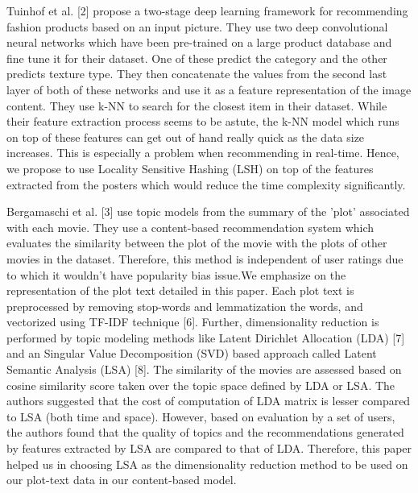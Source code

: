 \documentclass{article}
\begin{document}
Tuinhof et al. [2] propose a two-stage deep learning framework for recommending fashion products based on an input picture. They use two deep convolutional neural networks which have been pre-trained on a large product database and fine tune it for their dataset. One of these predict the category and the other predicts texture type. They then concatenate the values from the second last layer of both of these networks and use it as a feature representation of the image content. They use k-NN to search for the closest item in their dataset.
While their feature extraction process seems to be astute, the k-NN model which runs on top of these features can get out of hand really quick as the data size increases. This is especially a problem when recommending in real-time. Hence, we propose to use Locality Sensitive Hashing (LSH) on top of the features extracted from the posters which would reduce the time complexity significantly.

Bergamaschi et al. [3] use topic models from the summary of the 'plot' associated with each movie. They use a content-based recommendation system which evaluates the similarity between the plot of the movie with the plots of other movies in the dataset. Therefore, this method is independent of user ratings due to which it wouldn't have popularity bias issue.We emphasize on the representation of the plot text detailed in this paper. Each plot text is preprocessed by removing stop-words and lemmatization the words, and vectorized using TF-IDF technique [6]. Further, dimensionality reduction is performed by topic modeling methods like Latent Dirichlet Allocation (LDA) [7] and an Singular Value Decomposition (SVD) based approach called Latent Semantic Analysis (LSA) [8]. The similarity of the movies are assessed based on cosine similarity score taken over the topic space defined by LDA or LSA. The authors suggested that the cost of computation of LDA matrix is lesser compared to LSA (both time and space). However, based on evaluation by a set of users, the authors found that the quality of topics and the recommendations generated by features extracted by LSA are compared to that of LDA. Therefore, this paper helped us in choosing LSA as the dimensionality reduction method to be used on our plot-text data in our content-based model.
\end{document}
